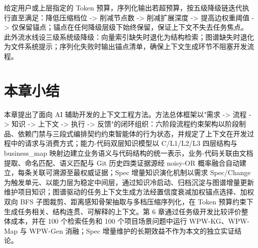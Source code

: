 给定用户或上层指定的 Token 预算，序列化输出若超预算，按五级降级链迭代执行直至满足：降低压缩档位 -> 削减节点数 -> 削减扩展深度 -> 提高边权重阈值 -> 仅保留锚点；锚点在任何降级层级下始终保留，保证上下文不失去任务焦点。此外流水线设三级系统级降级：向量索引缺失时退化为结构检索；图谱缺失时退化为文件系统提示；序列化失败时输出锚点清单，确保上下文生成环节不阻塞开发流程。


\section{本章小结}
本章提出了面向 AI 辅助开发的上下文工程方法。方法总体框架以"需求 -> 流程 -> 知识 -> 上下文 -> 执行 -> 反馈"的闭环组织：六阶段流程约束架构以阶段制品、依赖门禁与三段式编排契约约束智能体的行为状态，并规定了上下文在开发过程中的请求与消费方式；能力-代码双层知识模型以 C/L1/L2/L3 四层结构与 business\_map 映射边建立业务语义与代码结构的统一表示，业务-代码关联由文档提取、命名匹配、语义匹配与 Git 历史四类证据源经 noisy-OR 概率融合自动建立，每条关联可溯源至最权威证据；Spec 增量知识演化机制以需求 Spec/Change 为触发单元、以能力层为稳定中间层，通过知识冷启动、归档沉淀与图谱增量更新维护项目知识；图谱驱动的任务上下文生成方法经置信度衰减加权锚点选择、加权双向 BFS 子图裁剪、距离感知骨架抽取与多档压缩序列化，在 Token 预算约束下生成任务相关、结构连贯、可解释的上下文。第 6 章通过任务级开发比较评价整体成本，并在 100 个检索任务和 100 个项目场景问题中运行 WPW-KG、WPW-Map 与 WPW-Gen 消融；Spec 增量维护的长期效益不作为本文的独立实证结论。
